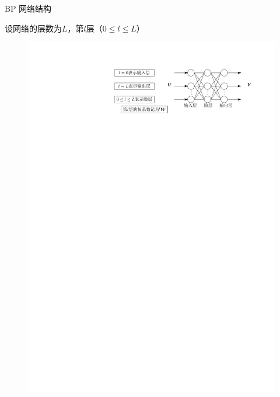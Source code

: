 \begin{note}
    BP 网络结构

    设网络的层数为$L$，第$l$层（$0\leq l\leq L$）
    \begin{figure}[htbp]
        \centering
        \includegraphics{image/BP网络结构.pdf}
    \end{figure}
\end{note}
